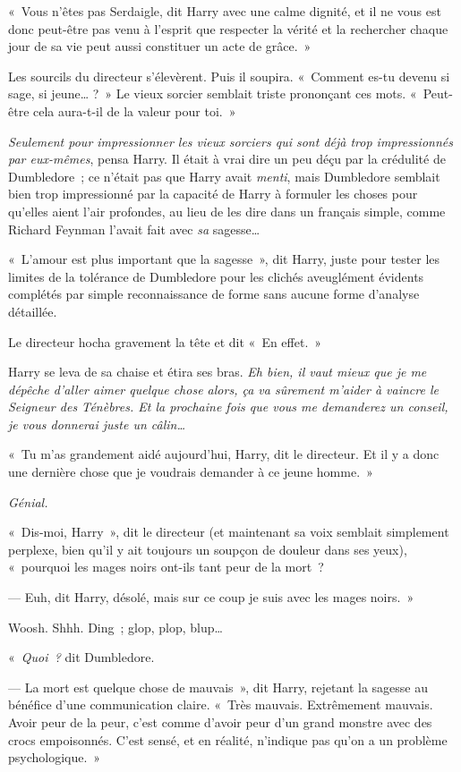 «~Vous n'êtes pas Serdaigle, dit Harry avec une calme dignité, et il ne vous est donc peut-être pas venu à l'esprit que respecter la vérité et la rechercher chaque jour de sa vie peut aussi constituer un acte de grâce.~»

Les sourcils du directeur s'élevèrent.
Puis il soupira.
«~Comment es-tu devenu si sage, si jeune…
?~» Le vieux sorcier semblait triste prononçant ces mots.
«~Peut-être cela aura-t-il de la valeur pour toi.~»

\emph{Seulement pour impressionner les vieux sorciers qui sont déjà trop impressionnés par eux-mêmes}, pensa Harry.
Il était à vrai dire un peu déçu par la crédulité de Dumbledore~; ce n'était pas que Harry avait \emph{menti}, mais Dumbledore semblait bien trop impressionné par la capacité de Harry à formuler les choses pour qu'elles aient l'air profondes, au lieu de les dire dans un français simple, comme Richard Feynman l'avait fait avec \emph{sa} sagesse…

«~L'amour est plus important que la sagesse~», dit Harry, juste pour tester les limites de la tolérance de Dumbledore pour les clichés aveuglément évidents complétés par simple reconnaissance de forme sans aucune forme d'analyse détaillée.

Le directeur hocha gravement la tête et dit «~En effet.~»

Harry se leva de sa chaise et étira ses bras.
\emph{Eh bien, il vaut mieux que je me dépêche d'aller aimer quelque chose alors, ça va sûrement m'aider à vaincre le Seigneur des Ténèbres.
Et la prochaine fois que vous me demanderez un conseil, je vous donnerai juste un câlin…}

«~Tu m'as grandement aidé aujourd'hui, Harry, dit le directeur.
Et il y a donc une dernière chose que je voudrais demander à ce jeune homme.~»

\emph{Génial.}

«~Dis-moi, Harry~», dit le directeur (et maintenant sa voix semblait simplement perplexe, bien qu'il y ait toujours un soupçon de douleur dans ses yeux), «~pourquoi les mages noirs ont-ils tant peur de la mort~?

--- Euh, dit Harry, désolé, mais sur ce coup je suis avec les mages noirs.~»

Woosh. Shhh.
Ding~; glop, plop, blup…

«~\emph{Quoi~?} dit Dumbledore.

--- La mort est quelque chose de mauvais~», dit Harry, rejetant la sagesse au bénéfice d'une communication claire.
«~Très mauvais.
Extrêmement mauvais.
Avoir peur de la peur, c'est comme d'avoir peur d'un grand monstre avec des crocs empoisonnés.
C'est sensé, et en réalité, n'indique pas qu'on a un problème psychologique.~»

